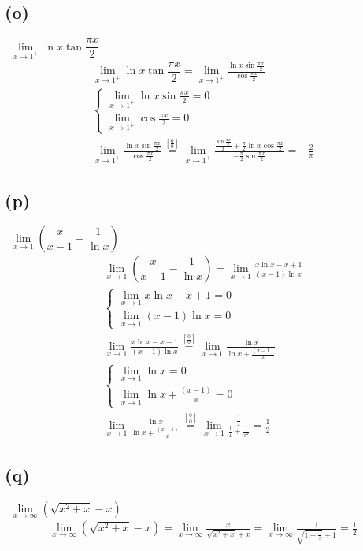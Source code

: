 \documentclass[12pt]{article}
\newcommand{\overfrac}[1]{\overset{[\frac{#1}{#1}]}{=}}
\newcommand{\subproblem}[1]{\subsection{(#1)} \,}
\begin{document}
\subproblem{o}
$\lim\limits_{x\to 1^+}\ln x \tan\dfrac{\pi x}{2}$
\begin{gather*}
    \lim\limits_{x\to 1^+}\ln x \tan\dfrac{\pi x}{2}=\lim\limits_{x\to 1^+}\frac{\ln x \sin \frac{\pi x}{2}}{\cos \frac{\pi x}{2}}\\
    \begin{cases}
        \lim\limits_{x\to 1^+}\ln x \sin \frac{\pi x}{2}=0\\
        \lim\limits_{x\to 1^+}\cos \frac{\pi x}{2}=0
    \end{cases}\\
    \lim\limits_{x\to 1^+}\frac{\ln x \sin \frac{\pi x}{2}}{\cos \frac{\pi x}{2}}\overfrac{0}\lim\limits_{x\to 1^+}\frac{\frac{\sin \frac{\pi x}{2}}{x}+\frac{\pi}{2}\ln x\cos \frac{\pi x}{2}}{-\frac{\pi}{2}\sin \frac{\pi x}{2}}=\boxed{-\frac{2}{\pi}}
\end{gather*}

\subproblem{p}
$\lim\limits_{x\to 1}\left(\dfrac{x}{x-1}-\dfrac{1}{\ln x}\right)$
\begin{gather*}
    \lim\limits_{x\to 1}\left(\dfrac{x}{x-1}-\dfrac{1}{\ln x}\right)=\lim\limits_{x\to 1}\frac{x \ln x-x+1}{(x-1)\ln x}\\
    \begin{cases}
        \lim\limits_{x\to 1} x\ln x-x+1=0\\
        \lim\limits_{x\to 1}(x-1)\ln x=0
    \end{cases}\\
    \lim\limits_{x\to 1}\frac{x \ln x-x+1}{(x-1)\ln x}\overfrac{0}\lim\limits_{x\to 1}\frac{\ln x}{\ln x+\frac{(x-1)}{x}}\\
    \begin{cases}
        \lim\limits_{x\to 1} \ln x=0\\
        \lim\limits_{x\to 1} \ln x+\frac{(x-1)}x=0
    \end{cases}\\
    \lim\limits_{x\to 1}\frac{\ln x}{\ln x+\frac{(x-1)}{x}}\overfrac{0}\lim\limits_{x\to 1}\frac{\frac{1}{x}}{\frac{1}{x}+\frac{1}{x^2}}=\boxed{\frac{1}{2}}
\end{gather*}

\subproblem{q}
$\lim\limits_{x\to \infty}\left(\sqrt{x^2+x}-x\right)$
\begin{gather*}
    \lim\limits_{x\to \infty}\left(\sqrt{x^2+x}-x\right)=\lim\limits_{x\to \infty}\frac{x}{\sqrt{x^2+x}+x}=\lim\limits_{x\to \infty}\frac{1}{\sqrt{1+\frac{1}{x}}+1}=\boxed{\frac{1}{2}}
\end{gather*}
\end{document}
